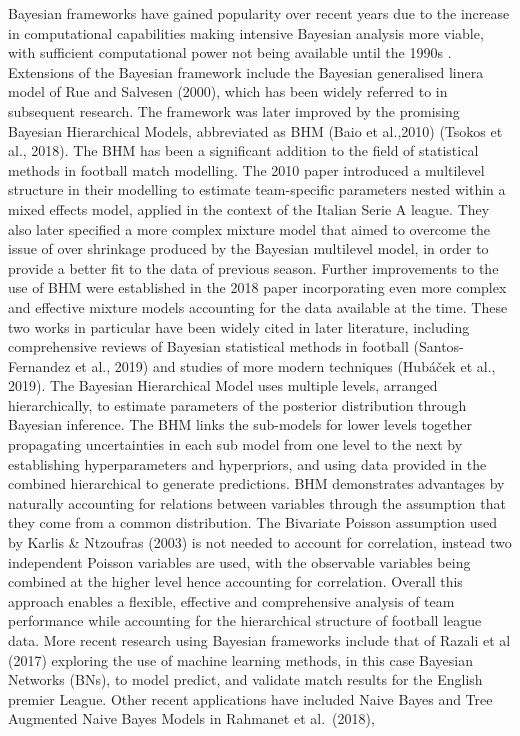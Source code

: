 \documentclass[
]{article}
\begin{document}
Bayesian frameworks have gained popularity over recent years due to the
increase in computational capabilities making intensive Bayesian
analysis more viable, with sufficient computational power not being
available until the 1990s . Extensions of the Bayesian framework include
the Bayesian generalised linera model of Rue and Salvesen (2000), which
has been widely referred to in subsequent research. The framework was
later improved by the promising Bayesian Hierarchical Models,
abbreviated as BHM (Baio et al.,2010) (Tsokos et al., 2018). The BHM has
been a significant addition to the field of statistical methods in
football match modelling. The 2010 paper introduced a multilevel
structure in their modelling to estimate team-specific parameters nested
within a mixed effects model, applied in the context of the Italian
Serie A league. They also later specified a more complex mixture model
that aimed to overcome the issue of over shrinkage produced by the
Bayesian multilevel model, in order to provide a better fit to the data
of previous season. Further improvements to the use of BHM were
established in the 2018 paper incorporating even more complex and
effective mixture models accounting for the data available at the time.
These two works in particular have been widely cited in later
literature, including comprehensive reviews of Bayesian statistical
methods in football (Santos-Fernandez et al., 2019) and studies of more
modern techniques (Hubáček et al., 2019). The Bayesian Hierarchical
Model uses multiple levels, arranged hierarchically, to estimate
parameters of the posterior distribution through Bayesian inference. The
BHM links the sub-models for lower levels together propagating
uncertainties in each sub model from one level to the next by
establishing hyperparameters and hyperpriors, and using data provided in
the combined hierarchical to generate predictions. BHM demonstrates
advantages by naturally accounting for relations between variables
through the assumption that they come from a common distribution. The
Bivariate Poisson assumption used by Karlis \& Ntzoufras (2003) is not
needed to account for correlation, instead two independent Poisson
variables are used, with the observable variables being combined at the
higher level hence accounting for correlation. Overall this approach
enables a flexible, effective and comprehensive analysis of team
performance while accounting for the hierarchical structure of football
league data. More recent research using Bayesian frameworks include that
of Razali et al (2017) exploring the use of machine learning methods, in
this case Bayesian Networks (BNs), to model predict, and validate match
results for the English premier League. Other recent applications have
included Naive Bayes and Tree Augmented Naive Bayes Models in Rahmanet
et al.~(2018),
\end{document}
